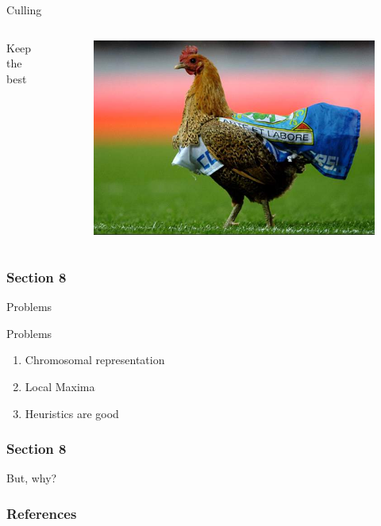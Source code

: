 \documentclass[18pt]{beamer}
\begin{document}
    \begin{frame}{Culling}
        \begin{columns}
                Keep the best
                \begin{figure}
                \includegraphics[scale=1]{chicken}
                \end{figure}
        \end{columns}
    \end{frame}


    \begin{centering}
        \begin{frame}[c]{}
            \frametitle{Section 8}
            Problems
        \end{frame}
    \end{centering}

    \begin{frame}{Problems}
        \begin{enumerate}
            \item Chromosomal representation
            \item Local Maxima
            \item Heuristics are good
        \end{enumerate}
    \end{frame}

    \begin{centering}
        \begin{frame}[c]{}
            \frametitle{Section 8}
            But, why?
        \end{frame}
    \end{centering}

    \begin{frame}[allowframebreaks]
            \frametitle{References}
            
            
    \end{frame}
\end{document}
